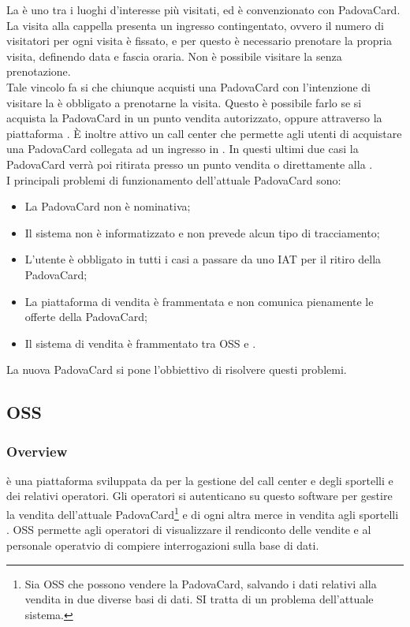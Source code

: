 \label{cappella}
La \cappella è uno tra i luoghi d'interesse più visitati, ed è convenzionato con PadovaCard. La visita alla cappella presenta un ingresso contingentato, ovvero il numero di visitatori per ogni visita è fissato, e per questo è necessario prenotare la propria visita, definendo data e fascia oraria. Non è possibile visitare la \cappella senza prenotazione. \\

Tale vincolo fa si che chiunque acquisti una PadovaCard con l'intenzione di visitare la \cappella è obbligato a prenotarne la visita. Questo è possibile farlo se si acquista la PadovaCard in un punto vendita autorizzato, oppure attraverso la piattaforma \vivaticket.
\`E inoltre attivo un call center che permette agli utenti di acquistare una PadovaCard collegata ad un ingresso in \cappella.
In questi ultimi due casi la PadovaCard verrà poi ritirata presso un punto vendita o direttamente alla \cappella.\\

I principali problemi di funzionamento dell'attuale PadovaCard sono:
\begin{itemize}
\item La PadovaCard non è nominativa;
\item Il sistema non è informatizzato e non prevede alcun tipo di tracciamento;
\item L'utente è obbligato in tutti i casi a passare da uno IAT per il ritiro della PadovaCard;
\item La piattaforma di vendita è frammentata e non comunica pienamente le offerte della PadovaCard;
\item Il sistema di vendita è frammentato tra OSS e \tlite.
\end{itemize}

La nuova PadovaCard si pone l'obbiettivo di risolvere questi problemi.



\subsection{OSS}\label{oss}
\subsubsection{Overview}
 è una piattaforma sviluppata da \net per la gestione del call center e degli sportelli  e dei relativi operatori.
Gli operatori si autenticano su questo software per gestire la vendita dell'attuale PadovaCard\footnote{Sia OSS che \tlite possono vendere la PadovaCard, salvando i dati relativi alla vendita in due diverse basi di dati. SI tratta di un problema dell'attuale sistema.} e di ogni altra merce in vendita agli sportelli . 
OSS permette agli operatori di visualizzare il rendiconto delle vendite e al personale operatvio di compiere interrogazioni sulla base di dati.

